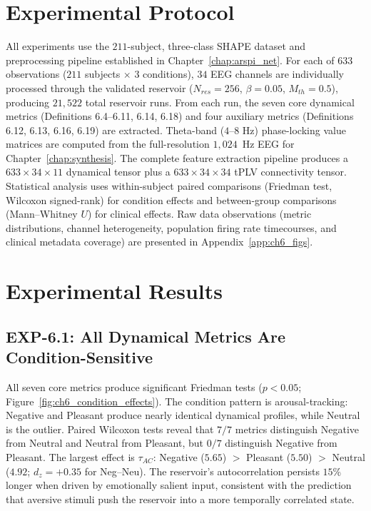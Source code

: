 \section{Experimental Protocol}
\label{sec:dynamics_protocol}

All experiments use the $211$-subject, three-class SHAPE dataset and preprocessing pipeline established in Chapter~\ref{chap:arspi_net}. For each of $633$ observations ($211$ subjects $\times$ $3$ conditions), $34$ EEG channels are individually processed through the validated reservoir ($N_{res} = 256$, $\beta = 0.05$, $M_{th} = 0.5$), producing $21{,}522$ total reservoir runs. From each run, the seven core dynamical metrics (Definitions 6.4--6.11, 6.14, 6.18) and four auxiliary metrics (Definitions 6.12, 6.13, 6.16, 6.19) are extracted. Theta-band ($4$--$8$ Hz) phase-locking value matrices are computed from the full-resolution $1{,}024$~Hz EEG for Chapter~\ref{chap:synthesis}. The complete feature extraction pipeline produces a $633 \times 34 \times 11$ dynamical tensor plus a $633 \times 34 \times 34$ tPLV connectivity tensor. Statistical analysis uses within-subject paired comparisons (Friedman test, Wilcoxon signed-rank) for condition effects and between-group comparisons (Mann--Whitney $U$) for clinical effects. Raw data observations (metric distributions, channel heterogeneity, population firing rate timecourses, and clinical metadata coverage) are presented in Appendix~\ref{app:ch6_figs}.


\section{Experimental Results}
\label{sec:ch6_results}

\subsection{EXP-6.1: All Dynamical Metrics Are Condition-Sensitive}

All seven core metrics produce significant Friedman tests ($p < 0.05$; Figure~\ref{fig:ch6_condition_effects}). The condition pattern is arousal-tracking: Negative and Pleasant produce nearly identical dynamical profiles, while Neutral is the outlier. Paired Wilcoxon tests reveal that $7/7$ metrics distinguish Negative from Neutral and Neutral from Pleasant, but $0/7$ distinguish Negative from Pleasant. The largest effect is $\tau_{AC}$: Negative ($5.65$) $>$ Pleasant ($5.50$) $>$ Neutral ($4.92$; $d_z = +0.35$ for Neg--Neu). The reservoir's autocorrelation persists $15\%$ longer when driven by emotionally salient input, consistent with the prediction that aversive stimuli push the reservoir into a more temporally correlated state.

